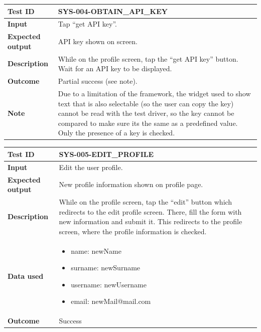 \begin{table}[H]
    \centering
    \begin{tabular}{p{3cm}p{10cm}}
    \textbf{Test ID} & SYS-004-OBTAIN\_API\_KEY \\ \hline
    \textbf{Input} & Tap “get API key”. \\ \hline
    \textbf{Expected output} & API key shown on screen. \\ \hline
    \textbf{Description} & While on the profile screen, tap the “get API key” button. Wait for an API key to be displayed. \\ \hline
    \textbf{Outcome} & Partial success (see note). \\ \hline
    \textbf{Note} & Due to a limitation of the framework, the widget used to show text that is also selectable (so the user can copy the key) cannot be read with the test driver, so the key cannot be compared to make sure its the same as a predefined value. Only the presence of a key is checked. \\ \hline
    \end{tabular}
\end{table}

\begin{table}[H]
    \centering
    \begin{tabular}{p{3cm}p{10cm}}
    \textbf{Test ID} & SYS-005-EDIT\_PROFILE \\ \hline
    \textbf{Input} & Edit the user profile. \\ \hline
    \textbf{Expected output} & New profile information shown on profile page. \\ \hline
    \textbf{Description} & While on the profile screen, tap the “edit” button which redirects to the edit profile screen. There, fill the form with new information and submit it. This redirects to the profile screen, where the profile information is checked. \\ \hline
    \textbf{Data used} & 
        \begin{itemize}[label={}] \itemsep0em
            \item name: newName
            \item surname: newSurname
            \item username: newUsername
            \item email: newMail@mail.com
        \end{itemize} \\ \hline
    \textbf{Outcome} & Success \\ \hline
    \end{tabular}
\end{table}

